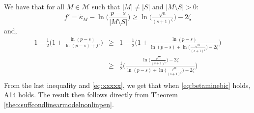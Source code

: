 \documentclass[aos]{imsart}
\theoremstyle{plain}
\begin{document}
We have that for all $M\in \mathcal{M}$ such that $|M|\neq |S|$ and $|M\setminus S|>0$:
$$f'= \tilde{\kappa}_{M} - \ln\Big(\frac{p-s}{|M\setminus S|}\Big) \geq \ln \big(\tfrac{\sqrt{n}}{(s+1)^{\zeta}}\big)-2\zeta$$
and,
\begin{eqnarray*}
    1-\frac12\Big(1+ \frac{\ln(p-s)}{\ln(p-s) + f'}\Big)
    &\geq& 1-\frac12\Big(1+\frac{\ln(p-s)}{\ln(p-s) + \ln \big(\tfrac{\sqrt{n}}{(s+1)^{\zeta}}\big)-2\zeta}\Big)\\
    &\geq&\frac12\Big(\frac{\ln \big(\tfrac{\sqrt{n}}{(s+1)^{\zeta}}\big)-2\zeta}{\ln(p-s) + \ln \big(\tfrac{\sqrt{n}}{(s+1)^{\zeta}}\big)-2\zeta}\Big)\\
\end{eqnarray*}
From the last inequality and \eqref{eq:xxxxx}, we get that when \eqref{eq:betaminebic} holds, A14 holds. The result then follows directly from Theorem \ref{theo:suffcondlinearmodelnonlinpen}.
\end{document}
